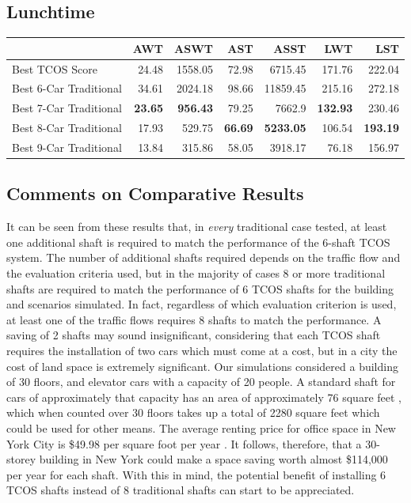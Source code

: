 \documentclass{UoYCSproject}
\begin{document}
\subsection{Lunchtime}
\begin{tabular}{l | r r r r r r}
    & AWT & ASWT & AST & ASST & LWT & LST \\
	\hline
    Best TCOS Score & 24.48 & 1558.05 & 72.98 & 6715.45 & 171.76 & 222.04 \\
	\hline
    Best 6-Car Traditional & 34.61 & 2024.18 & 98.66 & 11859.45 & 215.16 & 272.18 \\
    Best 7-Car Traditional & \textbf{23.65} & \textbf{956.43} & 79.25 & 7662.9 & \textbf{132.93} & 230.46 \\
    Best 8-Car Traditional & 17.93 & 529.75 & \textbf{66.69} & \textbf{5233.05} & 106.54 & \textbf{193.19} \\
    Best 9-Car Traditional & 13.84 & 315.86 & 58.05 & 3918.17 & 76.18 & 156.97
\end{tabular}

\subsection{Comments on Comparative Results}

It can be seen from these results that, in \textit{every} traditional case tested, at least one additional shaft is required to match the performance of the 6-shaft TCOS system.  The number of additional shafts required depends on the traffic flow and the evaluation criteria used, but in the majority of cases 8 or more traditional shafts are required to match the performance of 6 TCOS shafts for the building and scenarios simulated.  In fact, regardless of which evaluation criterion is used, at least one of the traffic flows requires 8 shafts to match the performance.  A saving of 2 shafts may sound insignificant, considering that each TCOS shaft requires the installation of two cars which must come at a cost, but in a city the cost of land space is extremely significant.  Our simulations considered a building of 30 floors, and elevator cars with a capacity of 20 people.  A standard shaft for cars of approximately that capacity has an area of approximately 76 square feet \citep{StannahFactSheet}, which when counted over 30 floors takes up a total of 2280 square feet which could be used for other means.  The average renting price for office space in New York City is \$49.98 per square foot per year \citep{Patrick2013OfficeSpace}.  It follows, therefore, that a 30-storey building in New York could make a space saving worth almost \$114,000 per year for each shaft.  With this in mind, the potential benefit of installing 6 TCOS shafts instead of 8 traditional shafts can start to be appreciated.
\end{document}
